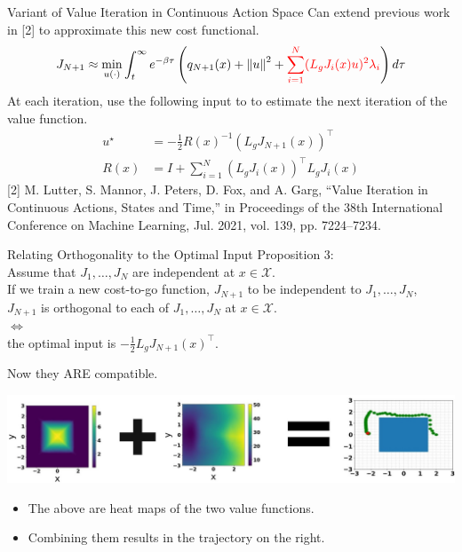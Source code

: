 \begin{frame}{Variant of Value Iteration in Continuous Action Space}
	Can extend previous work in [2] to approximate this new cost functional.
	\begin{align*}
                {J}_{N + 1} \approx \min_{u(\cdot)} \int_t^{\infty} e^{- \beta \tau } \left( q_{N + 1}(x) + { \lVert u \rVert }^2 + { \color{red} \sum_{i = 1}^N ( L_g {J}_i (x) u)^2 \lambda_i } \right) d \tau
	\end{align*}
	At each iteration, use the following input to to estimate the next iteration of the value function.
	\begin{align*}
                u^{\star} &= - \frac{1}{2} {R(x)}^{-1} ( L_g {J}_{N + 1} (x) )^{\top} \\ 
                R(x) &= I + \sum_{i = 1}^N ( L_g {J}_i (x) )^{\top} L_g {J}_i (x)
	\end{align*}
	\seprule
	\footnotesize{[2] M. Lutter, S. Mannor, J. Peters, D. Fox, and A. Garg, “Value Iteration in Continuous Actions, States and Time,” in Proceedings of the 38th International Conference on Machine Learning, Jul. 2021, vol. 139, pp. 7224–7234.}
\end{frame}

\begin{frame}{Relating Orthogonality to the Optimal Input}
Proposition 3:\\
Assume that ${J}_1, \ldots, {J}_N$ are independent at $x \in \mathcal{X}$.\\
If we train a new cost-to-go function, ${J}_{N + 1}$ to be independent to ${J}_1, \ldots, {J}_N$,\\
${J}_{N + 1}$ is orthogonal to each of ${J}_1, \ldots, {J}_N$ at $x \in \mathcal{X}$.\\ 
$\Leftrightarrow$\\ 
the optimal input is $- \frac{1}{2} L_g {J}_{N + 1} (x)^{\top}$.
\end{frame}

\begin{frame}{Now they ARE compatible.}
	\begin{minipage}{\textwidth}
		\centering		
		\includegraphics[width=1.\linewidth]{diagramMath2}
	\end{minipage}%
	\seprule
	\begin{itemize}
		\item{The above are heat maps of the two value functions.}
		\item{Combining them results in the trajectory on the right.}
	\end{itemize}
\end{frame}

